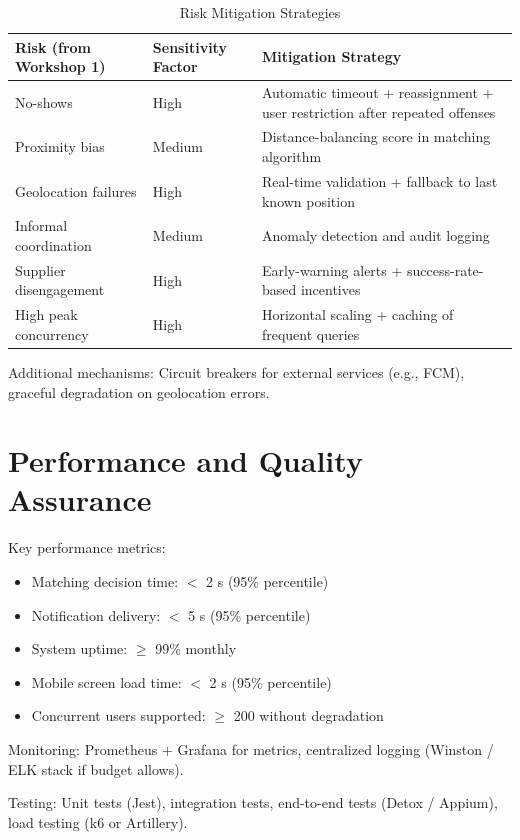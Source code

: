 \documentclass[conference]{IEEEtran}
\begin{document}
\begin{table}[H]
\centering
\caption{Risk Mitigation Strategies}
\label{tab:risks}
\begin{tabular}{@{}p{2.0cm}p{1.5cm}p{4.5cm}@{}}
\toprule
\textbf{Risk (from Workshop 1)} & \textbf{Sensitivity Factor} & \textbf{Mitigation Strategy} \\
\midrule
No-shows & High & Automatic timeout + reassignment + user restriction after repeated offenses \\
Proximity bias & Medium & Distance-balancing score in matching algorithm \\
Geolocation failures & High & Real-time validation + fallback to last known position \\
Informal coordination & Medium & Anomaly detection and audit logging \\
Supplier disengagement & High & Early-warning alerts + success-rate-based incentives \\
High peak concurrency & High & Horizontal scaling + caching of frequent queries \\
\bottomrule
\end{tabular}
\end{table}

Additional mechanisms: Circuit breakers for external services (e.g., FCM), graceful degradation on geolocation errors.

\section{Performance and Quality Assurance}

Key performance metrics:
\begin{itemize}
    \item Matching decision time: $<$ 2 s (95\% percentile)
    \item Notification delivery: $<$ 5 s (95\% percentile)
    \item System uptime: $\geq$ 99\% monthly
    \item Mobile screen load time: $<$ 2 s (95\% percentile)
    \item Concurrent users supported: $\geq$ 200 without degradation
\end{itemize}

Monitoring: Prometheus + Grafana for metrics, centralized logging (Winston / ELK stack if budget allows).

Testing: Unit tests (Jest), integration tests, end-to-end tests (Detox / Appium), load testing (k6 or Artillery).
\end{document}
